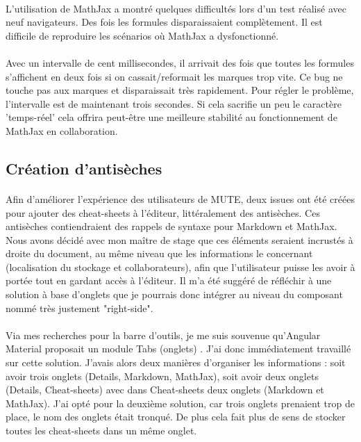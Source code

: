 \documentclass[12pt]{article}
\begin{document}
\paragraph{}
L'utilisation de MathJax a montré quelques difficultés lors d'un test réalisé avec neuf navigateurs. Des fois les formules disparaissaient complètement. Il est difficile de reproduire les scénarios où MathJax a dysfonctionné.
\paragraph{}
Avec un intervalle de cent millisecondes, il arrivait des fois que toutes les formules s'affichent en deux fois si on cassait/reformait les marques trop vite. Ce bug ne touche pas aux marques et disparaissait très rapidement. Pour régler le problème, l'intervalle est de maintenant trois secondes. Si cela sacrifie un peu le caractère 'temps-réel' cela offrira peut-être une meilleure stabilité au fonctionnement de MathJax en collaboration.

\newpage
\subsection{Création d'antisèches}
\paragraph{}
Afin d'améliorer l'expérience des utilisateurs de MUTE, deux issues ont été créées pour ajouter des cheat-sheets à l'éditeur, littéralement des antisèches. Ces antisèches contiendraient des rappels de syntaxe pour Markdown et MathJax. Nous avons décidé avec mon maître de stage que ces éléments seraient incrustés à droite du document, au même niveau que les informations le concernant (localisation du stockage et collaborateurs), afin que l'utilisateur puisse les avoir à portée tout en gardant accès à l'éditeur. Il m'a été suggéré de réfléchir à une solution à base d'onglets que je pourrais donc intégrer au niveau du composant nommé très justement "right-side".
\paragraph{}
Via mes recherches pour la barre d'outils, je me suis souvenue qu'Angular Material proposait un module Tabs (onglets) \cite{tabs}. J'ai donc immédiatement travaillé sur cette solution. J'avais alors deux manières d'organiser les informations : soit avoir trois onglets (Details, Markdown, MathJax), soit avoir deux onglets (Details, Cheat-sheets) avec dans Cheat-sheets deux onglets (Markdown et MathJax). J'ai opté pour la deuxième solution, car trois onglets prenaient trop de place, le nom des onglets était tronqué. De plus cela fait plus de sens de stocker toutes les cheat-sheets dans un même onglet.\\
\end{document}

